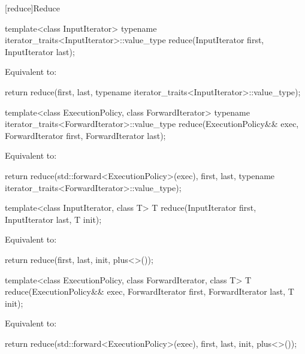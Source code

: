 [reduce]{Reduce}

%
\begin{itemdecl}
template<class InputIterator>
  typename iterator_traits<InputIterator>::value_type
    reduce(InputIterator first, InputIterator last);
\end{itemdecl}

\begin{itemdescr}
\pnum
\effects Equivalent to:
\begin{codeblock}
return reduce(first, last,
              typename iterator_traits<InputIterator>::value_type{});
\end{codeblock}
\end{itemdescr}

%
\begin{itemdecl}
template<class ExecutionPolicy, class ForwardIterator>
  typename iterator_traits<ForwardIterator>::value_type
    reduce(ExecutionPolicy&& exec,
           ForwardIterator first, ForwardIterator last);
\end{itemdecl}

\begin{itemdescr}
\pnum
\effects Equivalent to:
\begin{codeblock}
return reduce(std::forward<ExecutionPolicy>(exec), first, last,
              typename iterator_traits<ForwardIterator>::value_type{});
\end{codeblock}
\end{itemdescr}


%
\begin{itemdecl}
template<class InputIterator, class T>
  T reduce(InputIterator first, InputIterator last, T init);
\end{itemdecl}

\begin{itemdescr}
\pnum
\effects Equivalent to:
\begin{codeblock}
return reduce(first, last, init, plus<>());
\end{codeblock}
\end{itemdescr}

%
\begin{itemdecl}
template<class ExecutionPolicy, class ForwardIterator, class T>
  T reduce(ExecutionPolicy&& exec,
           ForwardIterator first, ForwardIterator last, T init);
\end{itemdecl}

\begin{itemdescr}
\pnum
\effects Equivalent to:
\begin{codeblock}
return reduce(std::forward<ExecutionPolicy>(exec), first, last, init, plus<>());
\end{codeblock}
\end{itemdescr}


